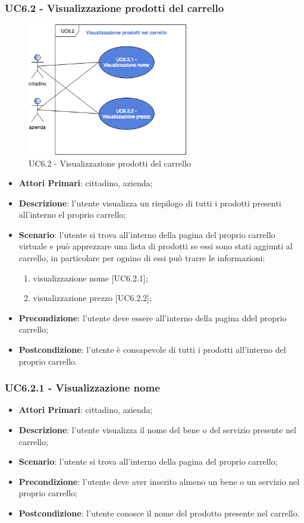  \subsubsection{UC6.2 - Visualizzazione prodotti del carrello}
  \begin{figure}[h]
 	\includegraphics[width=7cm]{res/images/UC6-2VisualizzazioneProdottiCarrello.png}
 	\centering
 	\caption{UC6.2 - Visualizzazione prodotti del carrello}
 \end{figure}
\begin{itemize}
	\item \textbf{Attori Primari}: cittadino, azienda\glo;
	\item \textbf{Descrizione}: l'utente visualizza un riepilogo di tutti i prodotti presenti all'interno el proprio carrello;
	\item \textbf{Scenario}: l'utente si trova all'interno della pagina del proprio carrello virtuale e può apprezzare una lista di prodotti se essi sono stati aggiunti al carrello, in particolare per ognino di essi può trarre le informazioni:
	 \begin{enumerate}[label=\alph*.]
		\item visualizzazione nome [UC6.2.1];
		\item visualizzazione prezzo [UC6.2.2];
	\end{enumerate} 
	\item \textbf{Precondizione}: l'utente deve essere all'interno della pagina ddel proprio carrello;
	\item \textbf{Postcondizione}: l'utente è consapevole di tutti i prodotti all'interno del proprio carrello.
\end{itemize}
 \subsubsection{UC6.2.1 - Visualizzazione nome}
\begin{itemize}
	\item \textbf{Attori Primari}: cittadino, azienda\glo;
	\item \textbf{Descrizione}: l'utente visualizza il nome del bene o del servizio presente nel carrello;
	\item \textbf{Scenario}: l'utente si trova all'interno della pagina del proprio carrello;
	\item \textbf{Precondizione}: l'utente deve aver inserito almeno un bene o un servizio nel proprio carrello;
	\item \textbf{Postcondizione}: l'utente conosce il nome del prodotto presente nel carrello.
\end{itemize}
